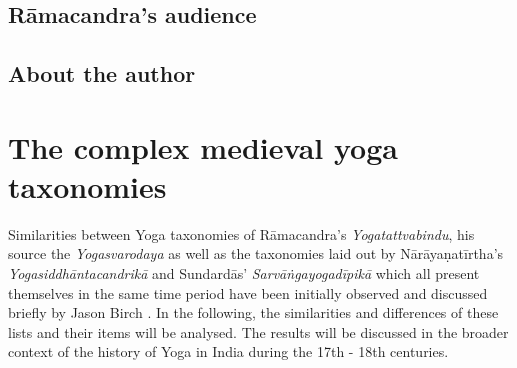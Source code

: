 \section{Rāmacandra's audience}

\section{About the author}

\chapter{The complex medieval yoga taxonomies}
\label{yogas_list}

Similarities between Yoga taxonomies of Rāmacandra's \textit{Yogatattvabindu}, his source the \textit{Yogasvarodaya} as well as the taxonomies laid out by Nārāyaṇatīrtha's \textit{Yogasiddhāntacandrikā} and Sundardās' \textit{Sarvāṅgayogadīpikā} which all present themselves in the same time period have been initially observed and discussed briefly by Jason Birch \parencite[415-416]{birch2014}. In the following, the similarities and differences of these lists and their items will be analysed. The results will be discussed in the broader context of the history of Yoga in India during the 17th - 18th centuries.

